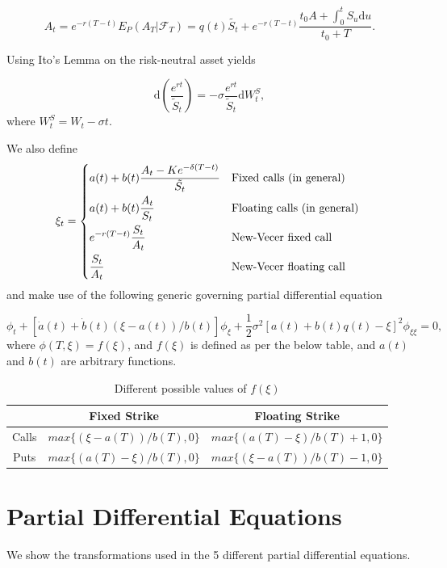 \documentclass{article}
\begin{document}
\begin{equation}
  A_t = e^{-r(T-t)}E_P(A_T|\mathcal{F}_T) = q(t)\tilde{S_t} + e^{-r(T-t)} \frac{t_0 A + \int_0^tS_u\mathrm{d}u}{t_0+T}.
\end{equation}

Using Ito's Lemma on the risk-neutral asset yields

\begin{equation}
 \textrm{d}(\frac{e^{rt}}{\tilde{S}_t}) = -\sigma \frac{e^{rt}}{\tilde{S}_t}\textrm{d}W_t^S,
\end{equation}
where \(W_t^S = W_t - \sigma t\).

We also define
\begin{equation}
  \xi_t =
  \begin{dcases*}
    a(t) + b(t) \frac{A_t - Ke^{-\delta(T-t)}}{\tilde{S_t}} & Fixed calls (in general) \\
    a(t) + b(t) \frac{A_t}{S_t} & Floating calls (in general) \\
    e^{-r(T-t)}\frac{S_t}{A_t} & New-Vecer fixed call \\
    \frac{S_t}{A_t} & New-Vecer floating call
  \end{dcases*}
\end{equation}
and make use of the following generic governing partial differential equation

\begin{equation}
  \phi_t + [\dot{a}(t) + \dot{b}(t)(\xi - a(t))/b(t)]\phi_\xi + \frac{1}{2}\sigma^2[a(t)+b(t)q(t) - \xi]^2\phi_{\xi\xi} = 0,
\end{equation}
where \(\phi(T, \xi) = f(\xi)\), and \(f(\xi)\) is defined as per the below table, and \(a(t)\) and \(b(t)\) are arbitrary functions.

\begin{table}[H]
  \begin{tabular}{|c|c|c|}
    \hline
    & Fixed Strike & Floating Strike \\
    \hline
    Calls & \(max\{(\xi - a(T))/b(T), 0\}\) & \(max\{(a(T) - \xi)/b(T) + 1, 0\}\) \\
    Puts & \(max\{(a(T) - \xi)/b(T ), 0\}\) & \(max\{(\xi - a(T))/b(T) - 1, 0\}\)\\
    \hline
  \end{tabular}
  \caption{Different possible values of \(f(\xi)\)}
\end{table}

\section{Partial Differential Equations}
We show the transformations used in the 5 different partial differential equations.
\end{document}
